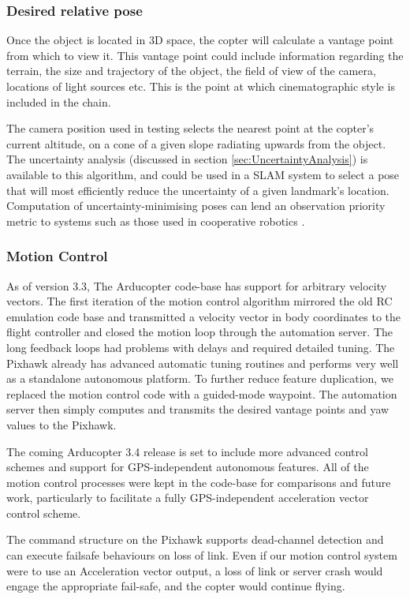 \documentclass{article}
\begin{document}
    \subsubsection{Desired relative pose}
      Once the object is located in 3D space, the copter will calculate a vantage point from which to view it.
      This vantage point could include information regarding the terrain, the size and trajectory of the object, the field of view of the camera, locations of light sources etc.  This is the point at which cinematographic style is included in the chain.

      The camera position used in testing selects the nearest point at the copter's current altitude, on a cone of a given slope radiating upwards from the object.
      The uncertainty analysis (discussed in section \ref{sec:UncertaintyAnalysis}) is available to this algorithm, and could be used in a SLAM system to select a pose that will most efficiently reduce the uncertainty of a given landmark's location.  Computation of uncertainty-minimising poses can lend an observation priority metric to systems such as those used in cooperative robotics \cite{TrilatUnderwater}.

    \subsubsection{Motion Control}
      As of version 3.3, The Arducopter code-base has support for arbitrary velocity vectors.  The first iteration of the motion control algorithm mirrored the old RC emulation code base and transmitted a velocity vector in body coordinates to the flight controller and closed the motion loop through the automation server.  The long feedback loops had problems with delays and required detailed tuning.
      The Pixhawk already has advanced automatic tuning routines and performs very well as a standalone autonomous platform.
      To further reduce feature duplication, we replaced the motion control code with a guided-mode waypoint.  The automation server then simply computes and transmits the desired vantage points and yaw values to the Pixhawk.

      The coming Arducopter 3.4 release is set to include more advanced control schemes and support for GPS-independent autonomous features.  All of the motion control processes were kept in the code-base for comparisons and future work, particularly to facilitate a fully GPS-independent acceleration vector control scheme.

      The command structure on the Pixhawk supports dead-channel detection and can execute failsafe behaviours on loss of link.  Even if our motion control system were to use an Acceleration vector output, a loss of link or server crash would engage the appropriate fail-safe, and the copter would continue flying.
\end{document}
